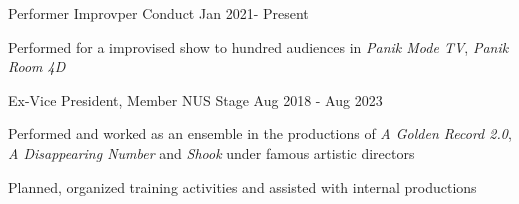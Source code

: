 

\begin{cventries}

  \cventry
  {Performer} %
  {Improvper Conduct} %
  {} %
  {Jan 2021- Present} %
  {
    \begin{cvitems} %
      \item {Performed for a improvised show to hundred audiences in \textit{Panik Mode TV}, \textit{Panik Room 4D}}
    \end{cvitems}
  }

  \cventry
    {Ex-Vice President, Member} %
    {NUS Stage} %
    {} %
    {Aug 2018 - Aug 2023} %
    {
      \begin{cvitems} %
        \item {Performed and worked as an ensemble in the productions of \textit{A Golden Record 2.0}, \textit{A Disappearing Number} and \textit{Shook} under famous artistic directors}
        \item {Planned, organized training activities and assisted with internal productions}
      \end{cvitems}
    }


\end{cventries}
